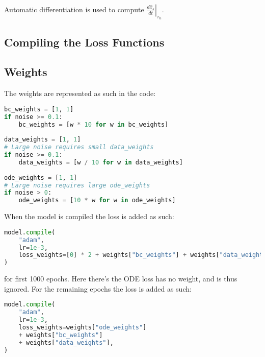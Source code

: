 \documentclass[a4paper]{article}
\begin{document}
Automatic differentiation is used to compute $\left. \frac{d \hat{x}_{s}}{d t}\right|_{\tau_{n}}$. 


\subsection{Compiling the Loss Functions}





\subsection{Weights}

The weights are represented as such in the code:
\begin{lstlisting}[language=python]
bc_weights = [1, 1]
if noise >= 0.1:
	bc_weights = [w * 10 for w in bc_weights]
	
data_weights = [1, 1]
# Large noise requires small data_weights
if noise >= 0.1:
	data_weights = [w / 10 for w in data_weights]
	
ode_weights = [1, 1]
# Large noise requires large ode_weights
if noise > 0:
	ode_weights = [10 * w for w in ode_weights]
\end{lstlisting}

When the model is compiled the loss is added as such:
\begin{lstlisting}[language=python]
model.compile(
	"adam",
	lr=1e-3,
	loss_weights=[0] * 2 + weights["bc_weights"] + weights["data_weights"],
)
\end{lstlisting}
for first 1000 epochs. Here there's the ODE loss has no weight, and is thus ignored. 
For the remaining epochs the loss is added as such:
\begin{lstlisting}[language=python]
model.compile(
	"adam",
	lr=1e-3,
	loss_weights=weights["ode_weights"]
	+ weights["bc_weights"]
	+ weights["data_weights"],
)
\end{lstlisting}
















	
\end{document}
